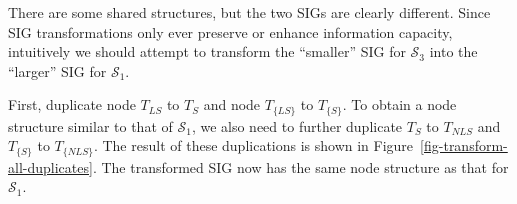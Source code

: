 \documentclass{article}
\newcommand{\identifier}[1]{\ensuremath{\mathit{#1}}}
\newcommand{\LS}{\identifier{LS}}
\newcommand{\NLS}{\identifier{NLS}}
\newcommand{\Sno}{\identifier{Sno}}
\newcommand{\Sname}{\identifier{Sname}}
\newcommand{\Status}{\identifier{Status}}
\newcommand{\City}{\identifier{City}}
\newcommand{\Type}[1]{\ensuremath{T_{#1}}}
\newcommand{\TT}[1]{\ensuremath{T_{\{#1\}}}}
\newcommand{\CityLondon}{\ensuremath{\{\City\colon\allowbreak\text{`\emph{London}'}\}}}
\newcommand{\TCityMinusLondon}{\ensuremath{\Type{\City} \setminus \CityLondon}}
\newcommand{\StackTSSC}{\ensuremath{\begin{array}{c}\Type{\Sname}\,\times \\ \Type{\Status} \times \Type{\City}\end{array}}}
\newcommand{\StackTSSL}{\ensuremath{\begin{array}{c}\Type{\Sname} \times \Type{\Status}\,\times \\ \CityLondon\end{array}}}
\newcommand{\StackTSSNL}{\ensuremath{\begin{array}{c}\Type{\Sname} \times \Type{\Status}\,\times \\ (\TCityMinusLondon)\end{array}}}
\newcommand{\StackTCityMinusLondon}{\ensuremath{\begin{array}{c}\Type{\City}\,\setminus \\ \CityLondon\end{array}}}
\newcommand{\schema}[1]{\ensuremath{\mathcal{S}_{#1}}}
\begin{document}
There are some shared structures, but the two SIGs are clearly different. Since SIG transformations only ever preserve or enhance information capacity, intuitively we should attempt to transform the ``smaller'' SIG for \(\schema{3}\) into the ``larger'' SIG for \(\schema{1}\).

First, duplicate node \(\Type{\LS}\) to \(\Type{S}\) and node \(\TT{\LS}\) to \(\TT{S}\). To obtain a node structure similar to that of \(\schema{1}\), we also need to further duplicate \(\Type{S}\) to \(\Type{\NLS}\) and \(\TT{S}\) to \(\TT{\NLS}\). The result of these duplications is shown in Figure~\ref{fig-transform-all-duplicates}. The transformed SIG now has the same node structure as that for \(\schema{1}\).


\begin{figure*}[t]
    \centering
\end{figure*}
\end{document}

